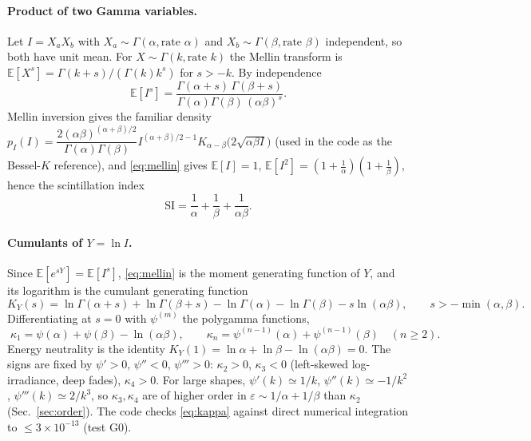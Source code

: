 \paragraph{Product of two Gamma variables.}
Let $I=X_aX_b$ with $X_a\sim\Gamma(\alpha,\text{rate }\alpha)$ and $X_b\sim\Gamma(\beta,\text{rate }\beta)$ independent, so both have unit mean. For $X\sim\Gamma(k,\text{rate }k)$ the Mellin transform is
$\mathbb E[X^{s}]=\Gamma(k+s)/(\Gamma(k)k^{s})$ for $s>-k$. By independence
\begin{equation}
  \mathbb E[I^{s}]=\frac{\Gamma(\alpha+s)\,\Gamma(\beta+s)}{\Gamma(\alpha)\Gamma(\beta)\,(\alpha\beta)^{s}} .
  \label{eq:mellin}
\end{equation}
Mellin inversion gives the familiar density
$p_I(I)=\dfrac{2(\alpha\beta)^{(\alpha+\beta)/2}}{\Gamma(\alpha)\Gamma(\beta)}I^{(\alpha+\beta)/2-1}K_{\alpha-\beta}\!\big(2\sqrt{\alpha\beta I}\big)$
(used in the code as the Bessel-$K$ reference), and \eqref{eq:mellin} gives $\mathbb E[I]=1$, $\mathbb E[I^2]=(1+\tfrac1\alpha)(1+\tfrac1\beta)$, hence the scintillation index
\begin{equation}
  \mathrm{SI}=\frac1\alpha+\frac1\beta+\frac1{\alpha\beta}.
\end{equation}

\paragraph{Cumulants of $Y=\ln I$.}
Since $\mathbb E[e^{sY}]=\mathbb E[I^s]$, \eqref{eq:mellin} is the moment generating function of $Y$, and its logarithm is the cumulant generating function
\begin{equation}
  K_Y(s)=\ln\Gamma(\alpha+s)+\ln\Gamma(\beta+s)-\ln\Gamma(\alpha)-\ln\Gamma(\beta)-s\ln(\alpha\beta),
  \qquad s>-\min(\alpha,\beta).
\end{equation}
Differentiating at $s=0$ with $\psi^{(m)}$ the polygamma functions,
\begin{equation}
  \boxed{\;\kappa_1=\psi(\alpha)+\psi(\beta)-\ln(\alpha\beta),\qquad
  \kappa_n=\psi^{(n-1)}(\alpha)+\psi^{(n-1)}(\beta)\quad(n\ge2).\;}
  \label{eq:kappa}
\end{equation}
Energy neutrality is the identity $K_Y(1)=\ln\alpha+\ln\beta-\ln(\alpha\beta)=0$. The signs are fixed by $\psi'>0$, $\psi''<0$, $\psi'''>0$: $\kappa_2>0$, $\kappa_3<0$ (left-skewed log-irradiance, deep fades), $\kappa_4>0$. For large shapes, $\psi'(k)\simeq1/k$, $\psi''(k)\simeq-1/k^2$, $\psi'''(k)\simeq2/k^3$, so $\kappa_3,\kappa_4$ are of higher order in $\varepsilon\sim1/\alpha+1/\beta$ than $\kappa_2$ (Sec.~\ref{sec:order}). The code checks \eqref{eq:kappa} against direct numerical integration to $\le3\times10^{-13}$ (test G0).

